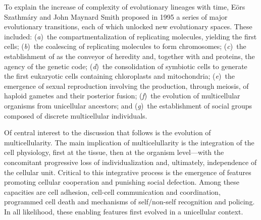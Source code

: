 


To explain the increase of complexity of evolutionary lineages with time, Eörs
Szathmáry and John Maynard Smith proposed in 1995 a series of major evolutionary
transitions,\cite{szathmary_major_1995} each of which unlocked new evolutionary
spaces.  These included: (\emph{a})~the compartmentalization of replicating
molecules, yielding the first cells; (\emph{b})~the coalescing of replicating
molecules to form chromosomes; (\emph{c})~the establishment of 
as the conveyor of heredity and, together with  and proteins, the
agency of the genetic code; (\emph{d})~the consolidation of symbiotic cells to
generate the first eukaryotic cells containing chloroplasts and mitochondria;
(\emph{e})~the emergence of sexual reproduction involving the production,
through meiosis, of haploid gametes and their posterior fusion; (\emph{f})~the
evolution of multicellular organisms from unicellular ancestors; and
(\emph{g})~the establishment of social groups composed of discrete multicellular
individuals.

Of central interest to the discussion that follows is the evolution of
multicellularity.  The main implication of multicelullarity is the integration
of the cell physiology, first at the tissue, then at the organism level---with
the concomitant progressive loss of individualization and, ultimately,
independence of the cellular unit.  Critical to this integrative process is the
emergence of features promoting cellular cooperation and punishing social
defection.  Among these capacities are cell adhesion, \mbox{cell-cell}
communication and coordination, programmed cell death and mechanisms of
self/non-self recognition and policing.\cite{grosberg_evolution_2007} In all
likelihood, these enabling features first evolved in a unicellular
context.\cite{bonner_development:_1974,bonner_first_2009,kaiser_building_2001}

